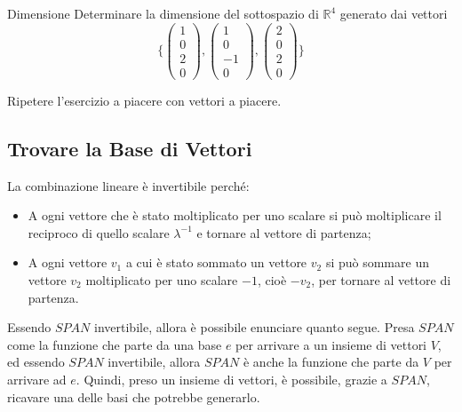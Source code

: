 \documentclass{article}
\begin{document}
\begin{exercise}{Dimensione}{}
    Determinare la dimensione del sottospazio di $\mathbb{R}^4$ generato dai vettori \[
    \{
        \begin{pmatrix} 1 \\ 0 \\ 2 \\ 0 \end{pmatrix},
        \begin{pmatrix} 1 \\ 0 \\ -1 \\ 0 \end{pmatrix},
        \begin{pmatrix} 2 \\ 0 \\ 2 \\ 0 \end{pmatrix}
    \}
    \]
    
    Ripetere l'esercizio a piacere con vettori a piacere.
\end{exercise}

\subsection{Trovare la Base di Vettori}

La combinazione lineare è invertibile perché:
\begin{itemize}
    \item A ogni vettore che è stato moltiplicato per uno scalare \lambda si può moltiplicare il reciproco di quello scalare $\lambda ^{-1}$ e tornare al vettore di partenza;
    \item A ogni vettore $v_1$ a cui è stato sommato un vettore $v_2$ si può sommare un vettore $v_2$ moltiplicato per uno scalare $-1$, cioè $-v_2$, per tornare al vettore di partenza.
\end{itemize}

Essendo \hyperref[def:funzione_span]{$SPAN$} invertibile, allora è possibile enunciare quanto segue. Presa \hyperref[def:funzione_span]{$SPAN$} come la funzione che parte da una base $e$ per arrivare a un insieme di vettori $V$, ed essendo \hyperref[def:funzione_span]{$SPAN$} invertibile, allora \hyperref[def:funzione_span]{$SPAN$} è anche la funzione che parte da $V$ per arrivare ad $e$. Quindi, preso un insieme di vettori, è possibile, grazie a \hyperref[def:funzione_span]{$SPAN$}, ricavare una delle basi che potrebbe generarlo.
\end{document}
